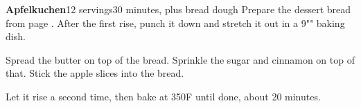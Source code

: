 \documentclass[../Cookbook.tex]{subfiles}
\begin{document}
\begin{recipe}[Apfelkuchen]{\textbf{Apfelkuchen}}{12 servings}{30 minutes, plus bread dough}
	Prepare the dessert bread from page \pageref{BaseDessertBread}.
	After the first rise, punch it down and stretch it out in a 9"" baking dish.
	
	Spread the butter on top of the bread.
	Sprinkle the sugar and cinnamon on top of that.
	Stick the apple slices into the bread.
	
	Let it rise a second time, then bake at 350\0F until done, about 20 minutes.
\end{recipe}
\end{document}
